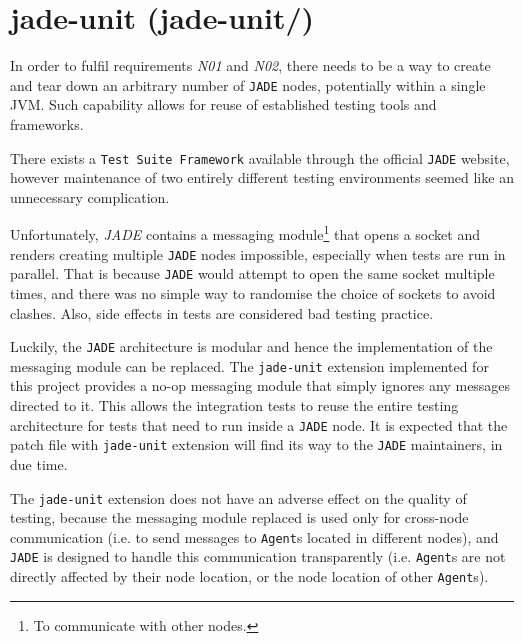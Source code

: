 \section{jade-unit (jade-unit/)}
\label{Chapters/Implementation/Jade-Unit}
In order to fulfil requirements \textit{N01} and \textit{N02}, there needs to be a way to create and tear down an arbitrary number of \texttt{JADE} nodes, potentially within a single JVM. Such capability allows for reuse of established testing tools and frameworks. 

There exists a \texttt{Test Suite Framework} available through the official \texttt{JADE} website, however maintenance of two entirely different testing environments seemed like an unnecessary complication.

Unfortunately, \textit{JADE} contains a messaging module\footnote{To communicate with other nodes.} that opens a socket and renders creating multiple \texttt{JADE} nodes impossible, especially when tests are run in parallel. That is because \texttt{JADE} would attempt to open the same socket multiple times, and there was no simple way to randomise the choice of sockets to avoid clashes. Also, side effects in tests are considered bad testing practice.

Luckily, the \texttt{JADE} architecture is modular and hence the implementation of the messaging module can be replaced. The \texttt{jade-unit} extension implemented for this project provides a no-op messaging module that simply ignores any messages directed to it. This allows the integration tests to reuse the entire testing architecture for tests that need to run inside a \texttt{JADE} node. It is expected that the patch file with \texttt{jade-unit} extension will find its way to the \texttt{JADE} maintainers, in due time.

The \texttt{jade-unit} extension does not have an adverse effect on the quality of testing, because the messaging module replaced is used only for cross-node communication (i.e. to send messages to \texttt{Agent}s located in different nodes), and \texttt{JADE} is designed to handle this communication transparently (i.e. \texttt{Agent}s are not directly affected by their node location, or the node location of other \texttt{Agent}s).